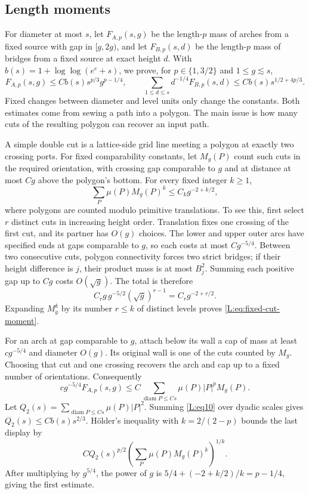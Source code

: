 \documentclass[11pt]{article}
\numberwithin{equation}{section}
\theoremstyle{definition}\newtheorem{definition}[theorem]{Definition}
\theoremstyle{remark}\newtheorem{remark}[theorem]{Remark}
\begin{document}
\subsection{Length moments}\label{L:step19}\label{L:prop:moments}

For diameter at most $s$, let $F_{A,p}(s,g)$ be the length-$p$ mass of
arches from a fixed source with gap in $[g,2g)$, and let
$F_{B,p}(s,d)$ be the length-$p$ mass of bridges from a fixed source
at exact height $d$.  With $b(s)=1+\log\log(e^e+s)$, we prove, for
$p\in\{1,3/2\}$ and $1\le g\lesssim s$,
\begin{equation}\label{L:eq:geometric-moments}
 F_{A,p}(s,g)\le Cb(s)s^{p/3}g^{p-1/4},\qquad
 \sum_{1\le d\le s}d^{-1/4}F_{B,p}(s,d)
 \le Cb(s)s^{1/2+4p/3}.
\end{equation}
Fixed changes between diameter and level units only change the constants.
Both estimates come from sewing a path into a polygon.  The main issue
is how many cuts of the resulting polygon can recover an input path.

A simple double cut is a lattice-side grid line meeting a polygon at
exactly two crossing ports.  For fixed comparability constants, let
$M_g(P)$ count such cuts in the required orientation, with crossing
gap comparable to $g$ and at distance at most $Cg$ above the polygon's
bottom.  For every fixed integer $k\ge1$,
\begin{equation}\label{L:eq:fixed-cut-moment}
 \sum_P\mu(P)M_g(P)^k\le C_k g^{-2+k/2},
\end{equation}
where polygons are counted modulo primitive translations.  To see
this, first select $r$ distinct cuts in increasing height order.
Translation fixes one crossing of the first cut, and its partner has
$O(g)$ choices.  The lower and upper outer arcs have specified ends
at gaps comparable to $g$, so each costs at most $Cg^{-5/4}$.
Between two consecutive cuts, polygon connectivity forces two strict
bridges; if their height difference is $j$, their product mass is at
most $B_j^2$.  Summing each positive gap up to $Cg$ costs $O(\sqrt g)$.
The total is therefore
\[
 C_r g\,g^{-5/2}(\sqrt g)^{r-1}=C_r g^{-2+r/2}.
\]
Expanding $M_g^k$ by its number $r\le k$ of distinct levels proves
\eqref{L:eq:fixed-cut-moment}.

For an arch at gap comparable to $g$, attach below its wall a cap of
mass at least $cg^{-5/4}$ and diameter $O(g)$.  Its original wall is
one of the cuts counted by $M_g$.  Choosing that cut and one crossing
recovers the arch and cap up to a fixed number of orientations.
Consequently
\[
 c g^{-5/4}F_{A,p}(s,g)
 \le C\sum_{\operatorname{diam}P\le Cs}\mu(P)|P|^p M_g(P).
\]
Let $Q_2(s)=\sum_{\operatorname{diam}P\le Cs}\mu(P)|P|^2$.
Summing \eqref{L:eq10} over dyadic scales gives
$Q_2(s)\le Cb(s)s^{2/3}$.  H\"older's inequality with
$k=2/(2-p)$ bounds the last display by
\[
 C Q_2(s)^{p/2}
 \left(\sum_P\mu(P)M_g(P)^k\right)^{1/k}.
\]
After multiplying by $g^{5/4}$, the power of $g$ is
$5/4+(-2+k/2)/k=p-1/4$, giving the first estimate.
\end{document}
